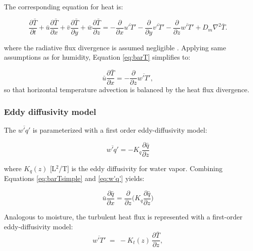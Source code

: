 \documentclass{article}
\begin{document}
    The corresponding equation for heat is: 
    
    \begin{equation}
        \frac{\partial \bar T}{\partial t} + 
         \bar u \frac{\partial \bar T}{\partial x} + 
         \bar v \frac{\partial \bar T}{\partial y} + 
         \bar{w} \frac{\partial \bar T}{\partial z} = 
        -  \frac{\partial}{\partial x}  \overline {u'T'}
        -  \frac{\partial}{\partial y}  \overline {v'T'}
        -  \frac{\partial}{\partial z}  \overline {w'T'}
        + D_m \nabla^2 \bar{T} .
    \label{eq:barT}
    \end{equation}
    
    where the radiative flux divergence is assumed negligible \cite{brutsaert2013evaporation}. 
    Applying same assumptions as for humidity, Equation \ref{eq:barT} simplifies to:
    
    \begin{equation}
    \label{eq:barTsimple}
         \bar u \frac{\partial \bar T}{\partial x} = 
           -  \frac{\partial}{\partial z}  \overline {w'T'}, 
    \end{equation}
    so that horizontal temperature advection is balanced by the heat flux divergence.  
    
    
    \subsubsection{Eddy diffusivity model}
    
    The $\overline {w'q'}$ is parameterized with a first order eddy-diffusivity model: 
    
    \begin{equation}  
    \label{eq:w'q'}
      \overline {w'q'} = - K_q   \frac{\partial \bar q}{\partial z} 
    \end{equation} 
    
    where  $K_q(z)$ [L$^2$/T] is the eddy diffusivity for water vapor.  
    Combining Equations \ref{eq:barTsimple} and \ref{eq:w'q'} yields: 
    
    \begin{equation}  
      \bar u  \frac{\partial \bar q}{\partial x}  =  
        \frac{\partial}{\partial z} \bigg(  K_q   \frac{\partial \bar q}{\partial z} \bigg)
        \label{eq:sutton_q}
    \end{equation}
    
    Analogous to moisture, the turbulent heat flux is represented with a first-order eddy-diffusivity model: 
    \begin{equation}
    \overline{w'T'} \;=\; -K_t(z)\,\frac{\partial \bar T}{\partial z},
    \end{equation}
    
\end{document}
